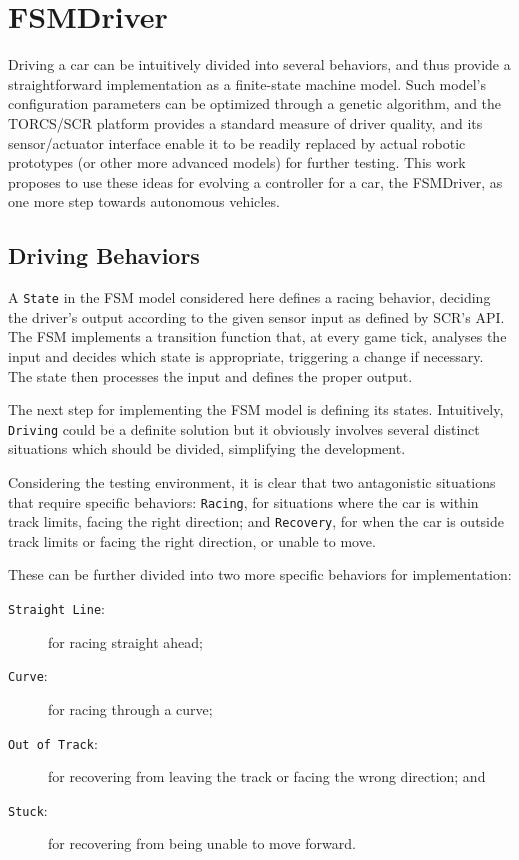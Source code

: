\section{FSMDriver}\label{sec:3}%
Driving a car can be intuitively divided into several behaviors, and thus provide a straightforward implementation as a finite-state machine model. Such model's configuration parameters can be optimized through a genetic algorithm, and the TORCS/SCR platform provides a standard measure of driver quality, and its sensor/actuator interface enable it to be readily replaced by actual robotic prototypes (or other more advanced models) for further testing. This work proposes to use these ideas for evolving a controller for a car, the FSMDriver, as one more step towards autonomous vehicles.

\newcommand{\state}[1]{\texttt{#1}}%
\newcommand{\racing}{\state{Racing}}%
\newcommand{\recovery}{\state{Recovery}}%
\newcommand{\SL}{\state{Straight Line}}%
\newcommand{\C}{\state{Curve}}%
\newcommand{\OT}{\state{Out of Track}}%
\newcommand{\St}{\state{Stuck}}%
\newcommand{\AC}{\state{Approaching Curve}}%
\newcommand{\IT}{\state{Inside Track}}%

\subsection{Driving Behaviors}%
A \state{State} in the FSM model considered here defines a racing behavior, deciding the driver's output according to the given sensor input as defined by SCR's API. The FSM implements a transition function that, at every game tick, analyses the input and decides which state is appropriate, triggering a change if necessary. The state then processes the input and defines the proper output.

The next step for implementing the FSM model is defining its states. Intuitively, \state{Driving} could be a definite solution but it obviously involves several distinct situations which should be divided, simplifying the development.

Considering the testing environment, it is clear that two antagonistic situations that require specific behaviors: \racing, for situations where the car is within track limits, facing the right direction; and \recovery, for when the car is outside track limits or facing the right direction, or unable to move.

These can be further divided into two more specific behaviors for implementation:
\begin{description}
	\item[\SL:] for racing straight ahead;
	\item[\C:] for racing through a curve;
	\item[\OT:] for recovering from leaving the track or facing the wrong direction; and
	\item[\St:] for recovering from being unable to move forward.
\end{description}

